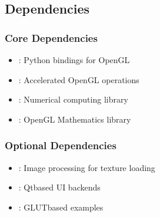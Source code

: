 \documentclass[a4paper,10pt,english,openany,oneside]{sphinxmanual}
\begin{document}
\subsection{Dependencies}
\label{\detokenize{installation:dependencies}}

\subsubsection{Core Dependencies}
\label{\detokenize{installation:core-dependencies}}\begin{itemize}
\item {} 
\sphinxAtStartPar
{}: Python bindings for OpenGL

\item {} 
\sphinxAtStartPar
{}: Accelerated OpenGL operations

\item {} 
\sphinxAtStartPar
{}: Numerical computing library

\item {} 
\sphinxAtStartPar
{}: OpenGL Mathematics library

\end{itemize}


\subsubsection{Optional Dependencies}
\label{\detokenize{installation:optional-dependencies}}\begin{itemize}
\item {} 
\sphinxAtStartPar
{}: Image processing for texture loading

\item {} 
\sphinxAtStartPar
{}: Qt\sphinxhyphen{}based UI backends

\item {} 
\sphinxAtStartPar
{}: GLUT\sphinxhyphen{}based examples

\end{itemize}
\end{document}
